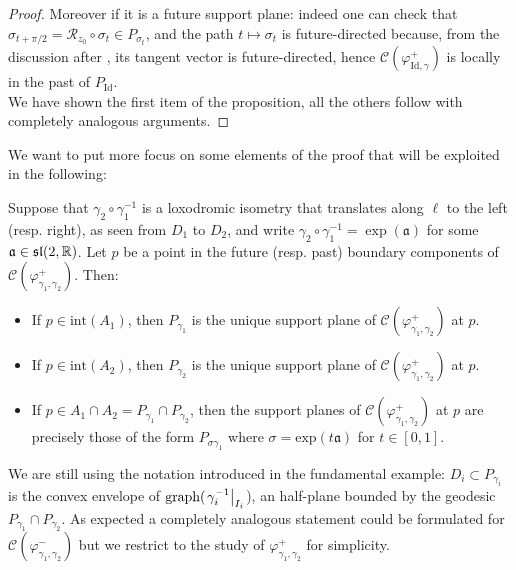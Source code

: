 \begin{proof}
     Moreover if it is a future support plane: indeed one can check that $\sigma_{t+\pi/2}=\mathcal{R}_{z_0}\circ\sigma_t\in P_{\sigma_t}$, and the path $t\mapsto\sigma_t$ is future-directed because, from the discussion after , its tangent vector is future-directed, hence $\mathcal{C}(\varphi_{\text{Id},\gamma}^+)$ is locally in the past of $P_{\text{Id}}$. \\
     We have shown the first item of the proposition, all the others follow with completely analogous arguments.
 \end{proof}



We want to put more focus on some elements of the proof that will be exploited in the following:
 \begin{corollary}\label{53}
    Suppose that $\gamma_2\circ\gamma_1^{-1}$ is a loxodromic isometry that translates along $\ell$ to the left (resp. right), as seen from $D_1$ to $D_2$, and write $\gamma_2\circ\gamma_1^{-1}=\exp(\mathfrak{a})$ for some $\mathfrak{a}\in\mathfrak{sl}(2,\mathbb{R})$. Let $p$ be a point in the future (resp. past) boundary components of $\mathcal{C}(\varphi_{\gamma_1,\gamma_2}^{+}).$ Then:
    \begin{itemize}
        \item If $p\in\text{int}(A_1)$, then $P_{\gamma_1}$ is the unique support plane of $\mathcal{C}(\varphi_{\gamma_1,\gamma_2}^{+})$ at $p$. 
       \item If $p\in\text{int}(A_2)$, then $P_{\gamma_2}$ is the unique support plane of $\mathcal{C}(\varphi_{\gamma_1,\gamma_2}^{+})$ at $p$. 
       \item If $p\in A_1\cap A_2= P_{\gamma_1}\cap P_{\gamma_2}$, then the support planes of $\mathcal{C}(\varphi_{\gamma_1,\gamma_2}^{+})$ at $p$ are precisely those of the form $P_{\sigma\gamma_1}$ where $\sigma=\text{exp}(t\mathfrak{a})$ for $t\in [0,1].$  
   \end{itemize}

    
 \end{corollary}

 We are still using the notation introduced in the fundamental example: $D_i\subset P_{\gamma_i}$ is the convex envelope of $\text{graph}(\left.\gamma_i^{-1}\right|_{I_i}$), an half-plane bounded by the geodesic $P_{\gamma_1}\cap P_{\gamma_2}.$ As expected a completely analogous statement could be formulated for $\mathcal{C}(\varphi_{\gamma_1,\gamma_2}^{-})$ but we restrict to the study of $\varphi_{\gamma_1,\gamma_2}^{+}$ for simplicity. 

